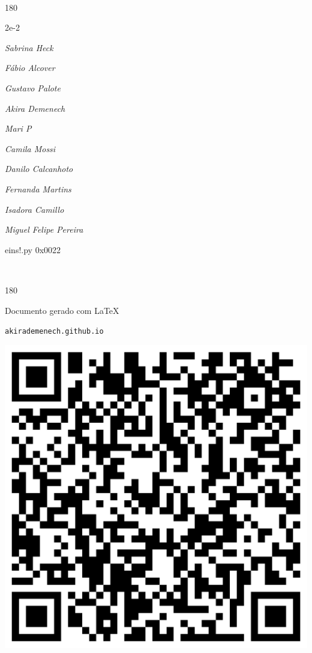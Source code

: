 \documentclass[12pt]{article}
\begin{document}
\pagebreak			

	\ 
	\vfill
	\begin{turn}{180}	
		\begin{minipage}{\textwidth}
		  	\ttfamily %
			\centering
			{\Huge 2e-2}
		  
			\hfill
		  
			

\textit{\small Sabrina Heck}

\textit{\small Fábio Alcover}

\textit{\small Gustavo Palote}

\textit{\small Akira Demenech}

\textit{\small Mari P}

\textit{\small Camila Mossi}

\textit{\small Danilo Calcanhoto}

\textit{\small Fernanda Martins}

\textit{\small Isadora Camillo}

\textit{\small Miguel Felipe Pereira}

\bigskip

eins!.py
0x0022


		\end{minipage}	
	\end{turn}
	\vfill
	\

\pagebreak

	\begin{turn}{180}	
		\begin{minipage}{\textwidth}		  
		  Documento gerado com \LaTeX			
		  
		  \texttt{akirademenech.github.io}

		  \includegraphics[height=0.3\textheight]{2e-2.pdf}

		\end{minipage}	
	\end{turn}  
		  
\end{document}

